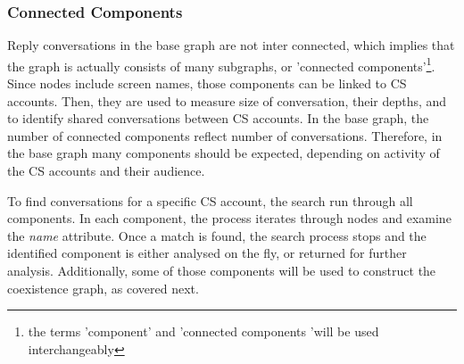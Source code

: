 \documentclass[sigconf]{acmart}
\begin{document}
{%


\subsubsection{Connected Components}

Reply conversations in the base graph are not inter connected, 
which implies that the graph is actually consists of many 
subgraphs, or 'connected components'{\footnote{the terms 
'component' and 'connected components 'will be used interchangeably}}. Since nodes include 
screen names, those components can be linked to CS accounts. Then,  
they are used to measure size of conversation, their
depths, and to identify shared conversations between CS
accounts. In the base graph, the number of connected components 
reflect number of conversations. Therefore, in the base graph 
many components should be expected, depending on activity of the CS
accounts and their audience.

To find conversations for a specific CS account, the search run through all
components. In each component, the process iterates through nodes and 
examine the {\emph{name}} attribute. Once a match is found, the search 
process stops and the identified component is either analysed on the fly, or
returned for further analysis. Additionally, some of those components will 
be used to construct the coexistence graph, as covered next.

}
\end{document}
